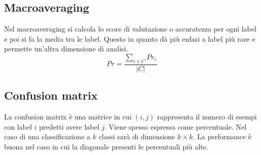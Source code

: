	\subsection{Macroaveraging}
	Nel macroaveraging si calcola lo score di valutazione o accuratezza per ogni label e poi si fa la media tra le label.
	Questo in quanto d\`a pi\`u enfasi a label pi\`u rare e permette un'altra dimensione di analisi.
	$$Pr=\dfrac{\sum\limits_{c\in C}Pr_c}{|C|}$$

	\subsection{Confusion matrix}
	La confusion matrix \`e una matrice in cui $(i, j)$ rappresenta il numero di esempi con label $i$ predetti avere label $j$.
	Viene spesso espressa come percentuale.
	Nel caso di una classificazione a $k$ classi sar\`a di dimensione $k\times k$.
	La performance \`e buona nel caso in cui la diagonale presenti le percentuali pi\`u alte.
